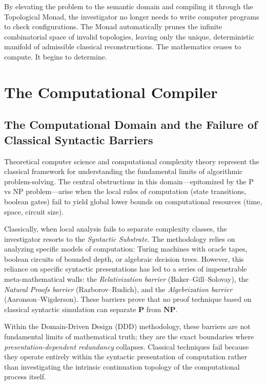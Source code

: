 \documentclass[12pt,openany]{extbook}
\theoremstyle{plain}
\theoremstyle{definition}
\begin{document}
By elevating the problem to the semantic domain and compiling it through the Topological Monad, the investigator no longer needs to write computer programs to check configurations. The Monad automatically prunes the infinite combinatorial space of invalid topologies, leaving only the unique, deterministic manifold of admissible classical reconstructions. The mathematics ceases to compute. It begins to determine.

\chapter{The Computational Compiler}

\section{The Computational Domain and the Failure of Classical Syntactic Barriers}

Theoretical computer science and computational complexity theory represent the classical framework for understanding the fundamental limits of algorithmic problem-solving. The central obstructions in this domain—epitomized by the P vs NP problem—arise when the local rules of computation (state transitions, boolean gates) fail to yield global lower bounds on computational resources (time, space, circuit size). 

Classically, when local analysis fails to separate complexity classes, the investigator resorts to the \emph{Syntactic Substrate}. The methodology relies on analyzing specific models of computation: Turing machines with oracle tapes, boolean circuits of bounded depth, or algebraic decision trees. However, this reliance on specific syntactic presentations has led to a series of impenetrable meta-mathematical walls: the \emph{Relativization barrier} (Baker--Gill--Solovay), the \emph{Natural Proofs barrier} (Razborov--Rudich), and the \emph{Algebrization barrier} (Aaronson--Wigderson). These barriers prove that no proof technique based on classical syntactic simulation can separate $\mathbf{P}$ from $\mathbf{NP}$.

Within the Domain-Driven Design (DDD) methodology, these barriers are not fundamental limits of mathematical truth; they are the exact boundaries where \emph{presentation-dependent redundancy} collapses. Classical techniques fail because they operate entirely within the syntactic presentation of computation rather than investigating the intrinsic continuation topology of the computational process itself.
\end{document}
